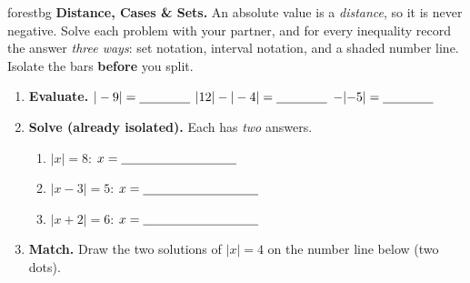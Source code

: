 \documentclass[10pt]{article}
\newcommand{\numline}[2]{%
  \draw[->, semithick, charcoal] (#1-0.4,0)--(#2+0.4,0);
  \foreach \x in {#1,...,#2}{\draw[charcoal] (\x,0.10)--(\x,-0.10) node[below, font=\scriptsize]{$\x$};}}
\begin{document}

\vspace{0.08in}

\begin{headlinebox}{forestbg}
\small\textbf{Distance, Cases \& Sets.} An absolute value is a \emph{distance}, so it is never
negative. Solve each problem with your partner, and for every inequality record the answer
\emph{three ways}: set notation, interval notation, and a shaded number line. Isolate the bars
\textbf{before} you split.
\end{headlinebox}

\vspace{0.06in}

\begin{tcolorbox}[colback=white, colframe=black!40, title=\textbf{Tier R --- Remediate},
    fonttitle=\bfseries, arc=1.5mm, left=3mm, right=3mm, top=2mm, bottom=2mm, breakable]
\begin{enumerate}[leftmargin=1.7em, itemsep=8pt]
  \item \textbf{Evaluate.} \quad $|-9| = \blank{1.4cm}$ \qquad $|12| - |-4| = \blank{1.4cm}$
        \qquad $-|{-5}| = \blank{1.4cm}$
  \item \textbf{Solve (already isolated).} Each has \emph{two} answers.
        \begin{enumerate}[label=(\alph*), leftmargin=1.8em, itemsep=6pt]
          \item $|x| = 8$: \quad $x = \blank{3.2cm}$
          \item $|x - 3| = 5$: \quad $x = \blank{3.2cm}$
          \item $|x + 2| = 6$: \quad $x = \blank{3.2cm}$
        \end{enumerate}
  \item \textbf{Match.} Draw the two solutions of $|x| = 4$ on the number line below (two dots).
        \begin{center}
        \end{center}
\end{enumerate}
\end{tcolorbox}
\end{document}
